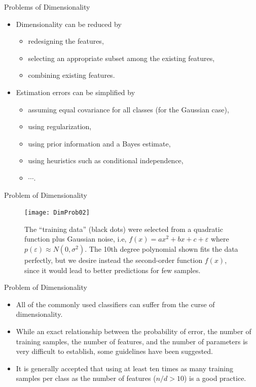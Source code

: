 \begin{frame}{Problems of Dimensionality}
\begin{itemize}
\item Dimensionality can be reduced by
\begin{itemize}
\item redesigning the features,
\item selecting an appropriate subset among the existing features,
\item combining existing features.
\end{itemize}
\item Estimation errors can be simplified by
\begin{itemize}
\item assuming equal covariance for all classes (for the Gaussian
case),
\item using regularization,
\item using prior information and a Bayes estimate,
\item using heuristics such as conditional independence,
\item $\cdots$.
\end{itemize}
\end{itemize}
\end{frame}

\begin{frame}{Problem of Dimensionality}
\begin{figure}
\texttt{[image: DimProb02]}
\caption{The ``training data'' (black dots) were selected from a quadratic function plus Gaussian noise, i.e, $f(x)=ax^2+bx+c+\varepsilon$ where $p(\varepsilon)\approx N(0,\sigma^2)$. The 10th degree polynomial shown fits the data perfectly, but we desire instead the second-order function $f(x)$, since it would lead to better predictions for few samples.}
\end{figure}
\end{frame}

\begin{frame}{Problem of Dimensionality}
\begin{itemize}
\setlength{\itemsep}{12pt}
\item All of the commonly used classifiers can suffer from the
curse of dimensionality.
\item While an exact relationship between the probability of error,
the number of training samples, the number of features, and
the number of parameters is very difficult to establish, some
guidelines have been suggested.
\item It is generally accepted that using at least ten times as
many training samples per class as the number of features
($n/d > 10$) is a good practice.
\end{itemize}
\end{frame}

